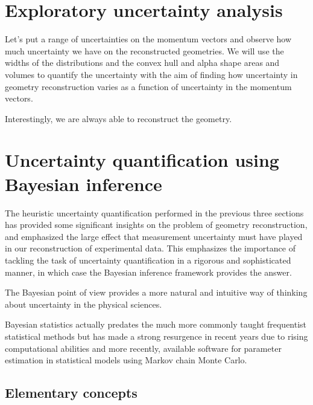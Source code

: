 \section{Exploratory uncertainty analysis} \label{sec:uncertaintyAnalysis}
Let's put a range of uncertainties on the momentum vectors and observe how much uncertainty we have on the reconstructed geometries. We will use the widths of the distributions and the convex hull and alpha shape areas and volumes to quantify the uncertainty with the aim of finding how uncertainty in geometry reconstruction varies as a function of uncertainty in the momentum vectors.


Interestingly, we are always able to reconstruct the geometry.

\section{Uncertainty quantification using Bayesian inference} \label{sec:uncertaintyBayesian}
The heuristic uncertainty quantification performed in the previous three sections has provided some significant insights on the problem of geometry reconstruction, and emphasized the large effect that measurement uncertainty must have played in our reconstruction of experimental data. This emphasizes the importance of tackling the task of uncertainty quantification in a rigorous and sophisticated manner, in which case the Bayesian inference framework provides the answer.

The Bayesian point of view provides a more natural and intuitive way of thinking about uncertainty in the physical sciences.


Bayesian statistics actually predates the much more commonly taught frequentist statistical methods but has made a strong resurgence in recent years due to rising computational abilities and more recently, available software for parameter estimation in statistical models using Markov chain Monte Carlo.

\subsection{Elementary concepts}

